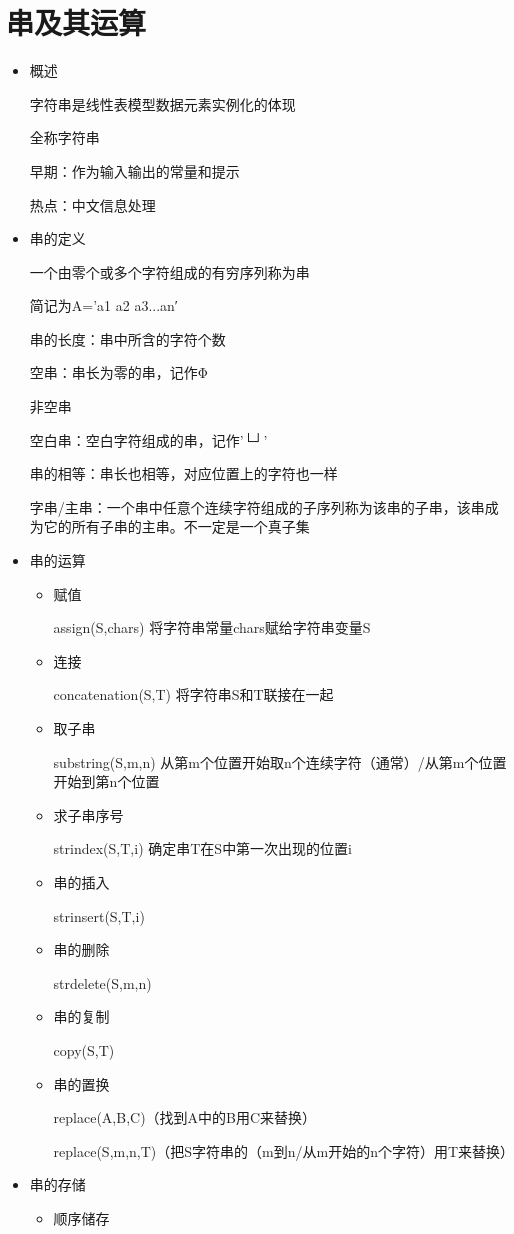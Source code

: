 \documentclass[AutoFakeBold]{LZUThesis2007}
\begin{document}
	\section{串及其运算}
	\begin{itemize}
		\item 概述
		
		字符串是线性表模型数据元素实例化的体现

		全称字符串

		早期：作为输入输出的常量和提示

		热点：中文信息处理
		\item 串的定义
		
		一个由零个或多个字符组成的有穷序列称为串

		简记为A='a1 a2  a3...an′

		串的长度：串中所含的字符个数

		空串：串长为零的串，记作Φ
		
		非空串

		空白串：空白字符组成的串，记作'└┘'

		串的相等：串长也相等，对应位置上的字符也一样

		字串/主串：一个串中任意个连续字符组成的子序列称为该串的子串，该串成为它的所有子串的主串。不一定是一个真子集
		\item 串的运算
			\begin{itemize}
				\item 赋值
				
				assign(S,chars)  将字符串常量chars赋给字符串变量S
				\item 连接
			
				concatenation(S,T) 将字符串S和T联接在一起
				\item 取子串
			
				substring(S,m,n) 从第m个位置开始取n个连续字符（通常）/从第m个位置开始到第n个位置
				\item 求子串序号
		
				strindex(S,T,i) 确定串T在S中第一次出现的位置i
				\item 串的插入
			
				strinsert(S,T,i)
				\item 串的删除
			
				strdelete(S,m,n)
				\item 串的复制
		
				copy(S,T)
				\item 串的置换
				
				replace(A,B,C)（找到A中的B用C来替换）

				replace(S,m,n,T)（把S字符串的（m到n/从m开始的n个字符）用T来替换）
			\end{itemize}
		\item 串的存储
			\begin{itemize}
				\item 顺序储存


\end{itemize}
\end{itemize}
\end{document}
